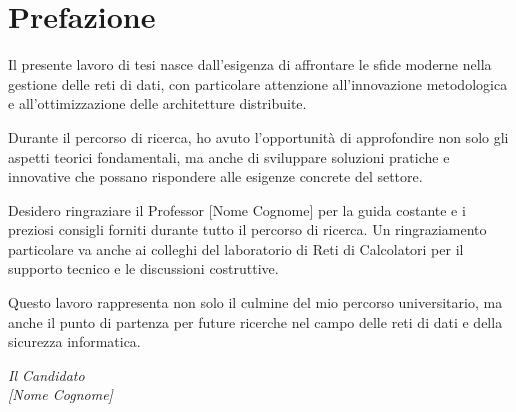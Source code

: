 \chapter*{Prefazione}

\begin{em} %

Il presente lavoro di tesi nasce dall'esigenza di affrontare le sfide moderne nella gestione delle reti di dati, 
con particolare attenzione all'innovazione metodologica e all'ottimizzazione delle architetture distribuite.

Durante il percorso di ricerca, ho avuto l'opportunità di approfondire non solo gli aspetti teorici 
fondamentali, ma anche di sviluppare soluzioni pratiche e innovative che possano rispondere alle 
esigenze concrete del settore.

Desidero ringraziare il Professor [Nome Cognome] per la guida costante e i preziosi consigli 
forniti durante tutto il percorso di ricerca. Un ringraziamento particolare va anche ai colleghi 
del laboratorio di Reti di Calcolatori per il supporto tecnico e le discussioni costruttive.

Questo lavoro rappresenta non solo il culmine del mio percorso universitario, ma anche il 
punto di partenza per future ricerche nel campo delle reti di dati e della sicurezza informatica.

\end{em}

\vspace{2cm}
\begin{flushright}
\textit{Il Candidato}\\
\textit{[Nome Cognome]}
\end{flushright}